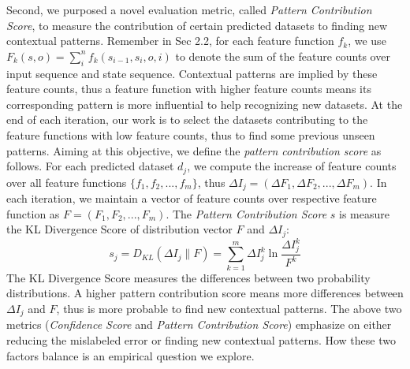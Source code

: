 \documentclass[10pt]{article}
\begin{document}
Second, we purposed a novel evaluation metric, called \emph{Pattern Contribution Score}, to measure the contribution of certain predicted datasets to finding new contextual patterns. Remember in Sec 2.2, for each feature function $f_k$, we use $F_k(s, o) = \sum_{i}^n f_{k}(s_{i-1}, s_{i}, o, i)$ to denote the sum of the feature counts over input sequence and state sequence. Contextual patterns are implied by these feature counts, thus a feature function with higher feature counts means its corresponding pattern is more influential to help recognizing new datasets. At the end of each iteration, our work is to select the datasets contributing to the feature functions with low feature counts, thus to find some previous unseen patterns. Aiming at this objective, we define the \emph{pattern contribution score} as follows. For each predicted dataset $d_j$, we compute the increase of feature counts over all feature functions $\{ f_1, f_2, ... ,f_m\}$, thus $\Delta I_j = (\Delta F_1, \Delta F_2, ... ,\Delta F_m)$. In each iteration, we maintain a vector of feature counts over respective feature function as $F = (F_1, F_2, ..., F_m)$. The \emph{Pattern Contribution Score} \textbf{$s$} is measure the KL Divergence Score of distribution vector $F$ and $\Delta I_j$:
\[
	s_j = D_{KL}(\Delta I_j \| F) = \sum_{k=1}^m \Delta I_j^k \ln \frac{\Delta I_j^k}{F^k}
\]
The KL Divergence Score measures the differences between two probability distributions. A higher pattern contribution score means more differences between $\Delta I_j$ and $F$, thus is more probable to find new contextual patterns. The above two metrics (\textit{Confidence Score} and \textit{Pattern Contribution Score}) emphasize on either reducing the mislabeled error or finding new contextual patterns. How these two factors balance is an empirical question we explore.
\end{document}
